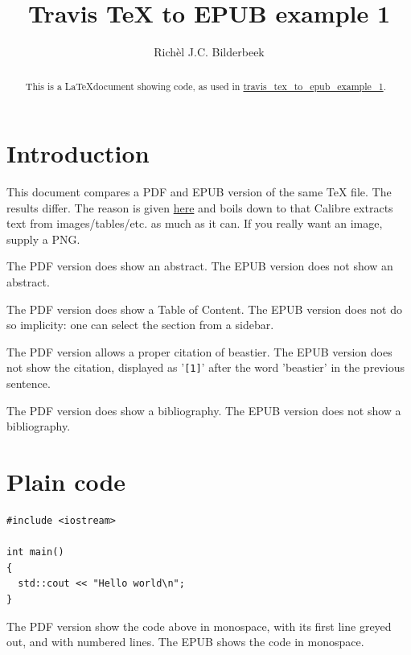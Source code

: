 \documentclass[ebook,12pt,oneside,openany]{memoir}
\title{Travis TeX to EPUB example 1}
\author{Rich\`el J.C. Bilderbeek}
\begin{document}
\maketitle

\tableofcontents

\begin{abstract}

This is a \LaTeX document showing code, as used in \href{https://github.com/richelbilderbeek/travis_tex_to_epub_example_1}{travis\_tex\_to\_epub\_example\_1}.

\end{abstract}

\section{Introduction}

This document compares a PDF and EPUB version of the same TeX file.
The results differ. The reason is given \href{https://ebooks.stackexchange.com/questions/6632/calibre-viewer-displays-books-wrong}{here}
and boils down to that Calibre extracts text from images/tables/etc. as much as it can.
If you really want an image, supply a PNG.

The PDF version does show an abstract. 
The EPUB version does not show an abstract.

The PDF version does show a Table of Content. 
The EPUB version does not do so implicity: one can select the section from a sidebar.

The PDF version allows a proper citation of beastier\cite{beastier}.
The EPUB version does not show the citation, displayed as '\verb;[1];' after the word 'beastier' in the previous sentence.

The PDF version does show a bibliography. 
The EPUB version does not show a bibliography.

\section{Plain code}

\begin{lstlisting}
#include <iostream>

int main()
{
  std::cout << "Hello world\n";
}
\end{lstlisting}

The PDF version show the code above in monospace, with its first line greyed out, and with numbered lines.
The EPUB shows the code in monospace.
\end{document}
